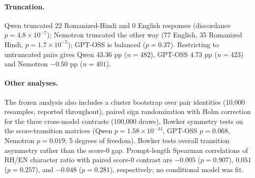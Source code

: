 \documentclass{article}
\begin{document}
\paragraph{Truncation.} Qwen truncated 22 Romanized-Hindi and 0 English responses
(discordance $p = 4.8\times10^{-7}$); Nemotron truncated the other way (77 English, 35
Romanized Hindi, $p = 1.7\times10^{-5}$); GPT-OSS is balanced ($p = 0.37$). Restricting to
untruncated pairs gives Qwen $43.36$ pp ($n = 482$), GPT-OSS $4.73$ pp ($n = 423$) and
Nemotron $-0.50$ pp ($n = 401$).

\paragraph{Other analyses.} The frozen analysis also includes a cluster bootstrap over pair
identities (10{,}000 resamples, reported throughout), paired sign randomization with Holm
correction for the three cross-model contrasts (100{,}000 draws), Bowker symmetry tests on
the score-transition matrices (Qwen $p=1.58\times10^{-44}$, GPT-OSS $p=0.068$,
Nemotron $p=0.019$; 5 degrees of freedom). Bowker tests overall transition asymmetry rather
than the score-0 gap. Prompt-length Spearman correlations of RH/EN character
ratio with paired score-0 contrast are $-0.005$ ($p=0.907$), $0.051$ ($p=0.257$),
and $-0.048$ ($p=0.281$), respectively; no conditional model was fit.

\clearpage

\end{document}
